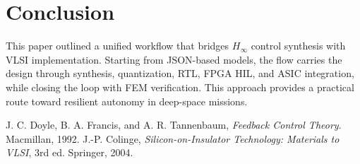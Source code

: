 \documentclass[conference]{IEEEtran}
\begin{document}
\section{Conclusion}
This paper outlined a unified workflow that bridges $H_\infty$ control
synthesis with VLSI implementation. Starting from JSON-based models, the flow
carries the design through synthesis, quantization, RTL, FPGA HIL, and ASIC
integration, while closing the loop with FEM verification. This approach
provides a practical route toward resilient autonomy in deep-space missions.


\begin{thebibliography}{1}
J. C. Doyle, B. A. Francis, and A. R. Tannenbaum, \textit{Feedback Control Theory}. Macmillan, 1992.
J.-P. Colinge, \textit{Silicon-on-Insulator Technology: Materials to VLSI}, 3rd ed. Springer, 2004.
\end{thebibliography}
\end{document}
